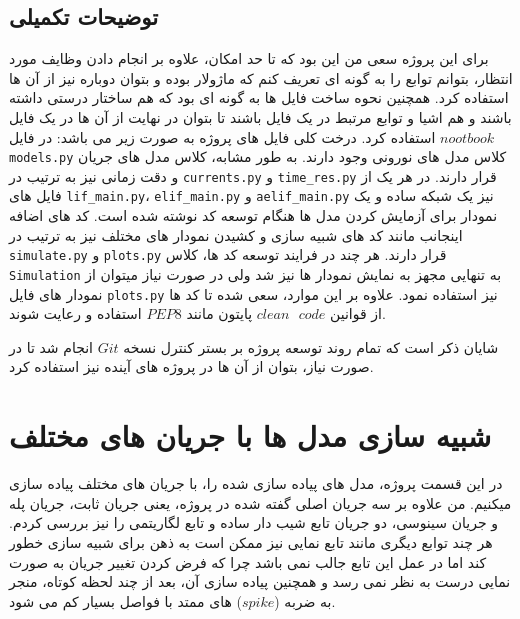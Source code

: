 \documentclass{article}
\begin{document}
        \subsection{توضیحات تکمیلی}
            برای این پروژه سعی من این بود که تا حد امکان، علاوه بر انجام دادن وظایف مورد انتظار، بتوانم توابع را به گونه ای تعریف کنم که ماژولار بوده و بتوان دوباره نیز از آن ها استفاده کرد. همچنین نحوه ساخت فایل ها به گونه ای بود که هم ساختار درستی داشته باشند و هم اشیا و توابع مرتبط در یک فایل باشند تا بتوان در نهایت از آن ها در یک فایل 
            $nootbook$ 
            استفاده کرد.
            درخت کلی فایل های پروژه به صورت زیر می باشد:
            در فایل 
            \texttt{models.py}
            کلاس مدل های نورونی وجود دارند. به طور مشابه، کلاس مدل های جریان و دقت زمانی نیز به ترتیب در 
            \texttt{currents.py} و
            \texttt{time\_res.py} 
            قرار دارند.
            در هر یک از فایل های 
            \texttt{lif\_main.py}، 
            \texttt{elif\_main.py} و 
            \texttt{aelif\_main.py}
            نیز یک شبکه ساده و یک نمودار برای آزمایش کردن مدل ها هنگام توسعه کد نوشته شده است.
            کد های اضافه اینجانب مانند کد های شبیه سازی و کشیدن نمودار های مختلف نیز به ترتیب در 
            \texttt{simulate.py} و
            \texttt{plots.py} 
            قرار دارند. هر چند در فرایند توسعه کد ها، کلاس
            \texttt{Simulation} 
            به تنهایی مجهز به نمایش نمودار ها نیز شد ولی در صورت نیاز میتوان از نمودار های فایل 
            \texttt{plots.py} 
            نیز استفاده نمود.
            علاوه بر این موارد، سعی شده تا کد ها از قوانین 
            $clean\text{ }code$ 
            پایتون مانند 
            $PEP8$ 
            استفاده و رعایت شوند.

            شایان ذکر است که تمام روند توسعه پروژه بر بستر کنترل نسخه 
            $Git$ 
            انجام شد تا در صورت نیاز، بتوان از آن ها در پروژه های آینده نیز استفاده کرد.

\newpage
    \section{شبیه سازی مدل ها با جریان های مختلف}
        در این قسمت پروژه، مدل های پیاده سازی شده را، با جریان های مختلف پیاده سازی میکنیم. من علاوه بر سه جریان اصلی گفته شده در پروژه، یعنی جریان ثابت، جریان پله و جریان سینوسی، دو جریان تابع شیب دار ساده و تابع لگاریتمی را نیز بررسی کردم. هر چند توابع دیگری مانند تابع نمایی نیز ممکن است به ذهن برای شبیه سازی خطور کند اما در عمل این تابع جالب نمی باشد چرا که فرض کردن تغییر جریان به صورت نمایی درست به نظر نمی رسد و همچنین پیاده سازی آن، بعد از چند لحظه کوتاه، منجر به ضربه 
        ($spike$) 
        های ممتد با فواصل بسیار کم می شود. 
        
\end{document}

